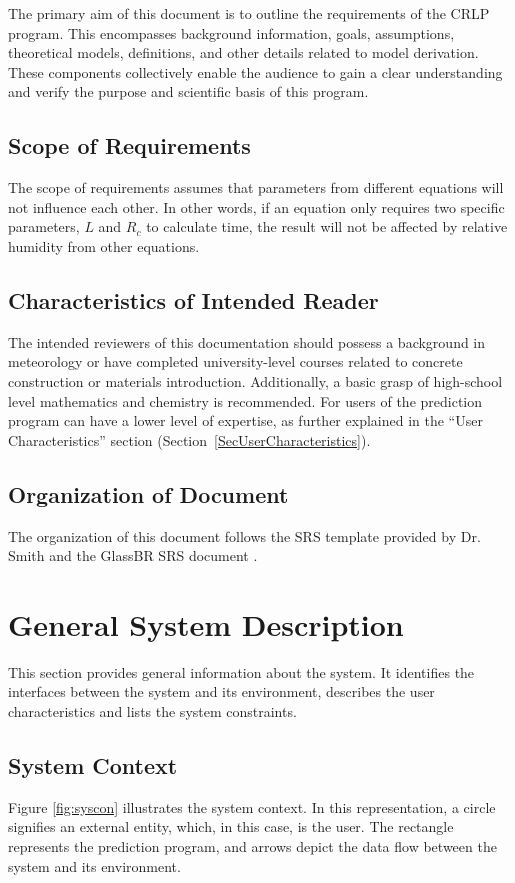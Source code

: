 \documentclass[12pt]{article}
\begin{document}
The primary aim of this document is to outline the requirements of the CRLP program. This encompasses background information, goals, assumptions, theoretical models, definitions, and other details related to model derivation. These components collectively enable the audience to gain a clear understanding and verify the purpose and scientific basis of this program.

\subsection{Scope of Requirements} 
The scope of requirements assumes that parameters from different equations will not influence each other. In other words, if an equation only requires two specific parameters, $L$ and $R_{c}$ to calculate time, the result will not be affected by relative humidity from other equations.

\subsection{Characteristics of Intended Reader} \label{sec_IntendedReader}
The intended reviewers of this documentation should possess a background in meteorology or have completed university-level courses related to concrete construction or materials introduction. Additionally, a basic grasp of high-school level mathematics and chemistry is recommended. For users of the prediction program can have a lower level of expertise, as further explained in the ``User Characteristics'' section (Section~\ref{SecUserCharacteristics}).

\subsection{Organization of Document}

The organization of this document follows the SRS template \cite{srstem} provided by Dr. Smith and the GlassBR SRS document \cite{glassbr_spec}.

\section{General System Description}

This section provides general information about the system.  It identifies the interfaces between the system and its environment, describes the user characteristics and lists the system constraints.  

\subsection{System Context}
{Figure \ref{fig:syscon}} illustrates the system context. In this representation, a circle signifies an external entity, which, in this case, is the user. The rectangle represents the prediction program, and arrows depict the data flow between the system and its environment.
\end{document}
